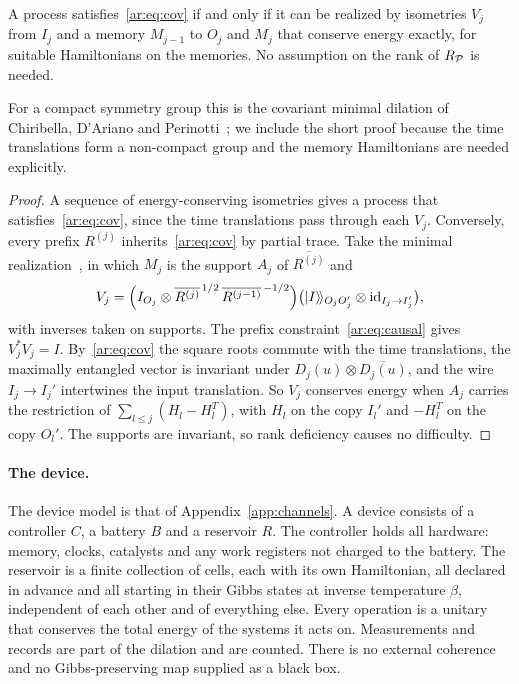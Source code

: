 \begin{lemma}\label{ar:lem:realization}
A process satisfies~\eqref{ar:eq:cov} if and only if it can be realized by isometries $V_j$ from $I_j$ and a memory $M_{j-1}$ to $O_j$ and $M_j$ that conserve energy exactly, for suitable Hamiltonians on the memories. No assumption on the rank of $R_\mathcal P$ is needed.
\end{lemma}

For a compact symmetry group this is the covariant minimal dilation of Chiribella, D'Ariano and Perinotti~\cite[Eq.~(15)]{CDPcov09}; we include the short proof because the time translations form a non-compact group and the memory Hamiltonians are needed explicitly.

\begin{proof}
A sequence of energy-conserving isometries gives a process that satisfies~\eqref{ar:eq:cov}, since the time translations pass through each $V_j$. Conversely, every prefix $R^{(j)}$ inherits~\eqref{ar:eq:cov} by partial trace. Take the minimal realization~\cite{CDP09}, in which $M_j$ is the support $A_j$ of $\overline{R^{(j)}}$ and
\[
V_j=\Bigl(I_{O_j}\otimes\overline{R^{(j)}}^{\,1/2}\,\overline{R^{(j-1)}}^{\,-1/2}\Bigr)\bigl(|I\rangle\!\rangle_{O_jO_j'}\otimes\mathrm{id}_{I_j\to I_j'}\bigr),
\]
with inverses taken on supports. The prefix constraint~\eqref{ar:eq:causal} gives $V_j^*V_j=I$. By~\eqref{ar:eq:cov} the square roots commute with the time translations, the maximally entangled vector is invariant under $D_j(u)\otimes\overline{D_j(u)}$, and the wire $I_j\to I_j'$ intertwines the input translation. So $V_j$ conserves energy when $A_j$ carries the restriction of $\sum_{l\le j}(H_l-H_l^T)$, with $H_l$ on the copy $I_l'$ and $-H_l^T$ on the copy $O_l'$. The supports are invariant, so rank deficiency causes no difficulty.
\end{proof}

\paragraph{The device.} The device model is that of Appendix~\ref{app:channels}. A device consists of a controller $C$, a battery $B$ and a reservoir $R$. The controller holds all hardware: memory, clocks, catalysts and any work registers not charged to the battery. The reservoir is a finite collection of cells, each with its own Hamiltonian, all declared in advance and all starting in their Gibbs states at inverse temperature $\beta$, independent of each other and of everything else. Every operation is a unitary that conserves the total energy of the systems it acts on. Measurements and records are part of the dilation and are counted. There is no external coherence and no Gibbs-preserving map supplied as a black box.

